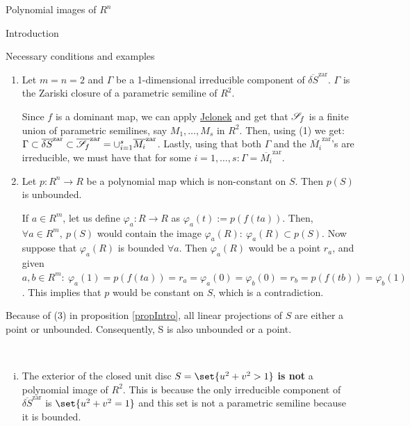 \documentclass[11pt, a4paper, english, twoside, notitlepage]{report}
\begin{document}
\begin{chapter}{Polynomial images of $R^n$}
\begin{section}{Introduction}
\begin{subsection}{Necessary conditions and examples}
\begin{proposition}
\begin{enumerate}[(1)]
			\item Let $m = n = 2$ and $\Gamma$ be a 1-dimensional irreducible component of $\overline{\delta S}^{\text{zar}}$. $\Gamma$ is the Zariski closure of a parametric semiline of $R^2$.
				\begin{Proof}
					Since $f$ is a dominant map, we can apply \hyperref[jelonek]{Jelonek} and get that $\S_f$ is a finite union of parametric semilines, say $M_1, \dots, M_s$ in $R^2$. Then, using (1) we get: $\Gamma \subset \overline{\delta S}^{\text{zar}} \subset \overline{\S_f}^{\text{zar}} = \cup_{i=1}^s  \overline{M_i}^{\text{zar}}$. Lastly, using that both $\Gamma$ and the $\overline{M_i}^{\text{zar}}$'s are irreducible, we must have that for some $i = 1, \dots, s: \Gamma = \overline{M_i}^{\text{zar}}$.
				\end{Proof}
			
			\item Let $p:R^n \rightarrow R$ be a polynomial map which is non-constant on $S$. Then $p(S)$ is unbounded.
				\begin{Proof}
					If $a \in R^m$, let us define $\varphi_a:R \rightarrow R$ as $\varphi_a(t) := p(f(ta))$. Then, $\forall a \in R^m,\ p(S)$ would contain the image $\varphi_a(R):\ \varphi_a(R) \subset p(S)$. Now suppose that $\varphi_a(R)$ is bounded $\forall a$. Then $\varphi_a(R)$ would be a point $r_a$, and given $a, b \in R^m: \ \varphi_a(1) = p(f(ta)) = r_a = \varphi_a(0) = \varphi_b(0) = r_b = p(f(tb)) = \varphi_b(1)$. This implies that $p$ would be constant on $S$, which is a contradiction.
				\end{Proof}
			
		\end{enumerate}
		
	\end{proposition}	
	
	\begin{corolary}
		Because of (3) in proposition \ref{propIntro}, all linear projections of $S$ are either a point or unbounded. Consequently, S is also unbounded or a point.
	\end{corolary}
	
	\begin{example}\label{introExample}
		\
		\begin{enumerate}[(i)]
			
			\item The exterior of the closed unit disc $S = \set{u^2 + v^2 > 1}$ \textbf{is not} a polynomial image of $R^2$. This is because the only irreducible component of $\overline{\delta S}^{\text{zar}}$ is $\set{u^2 + v^2 = 1}$ and this set is not a parametric semiline because it is bounded.
			

\end{enumerate}
\end{example}
\end{subsection}
\end{section}
\end{chapter}
\end{document}
